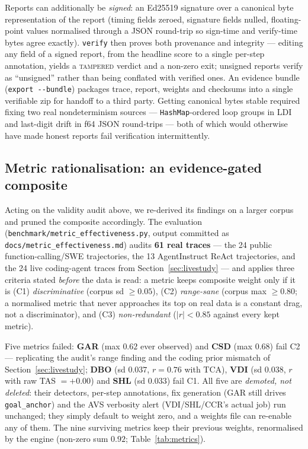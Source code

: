\documentclass[11pt]{article}
\newcommand{\code}[1]{\texttt{#1}}
\begin{document}
Reports can additionally be \emph{signed}: an Ed25519 signature over a
canonical byte representation of the report (timing fields zeroed, signature
fields nulled, floating-point values normalised through a JSON round-trip so
sign-time and verify-time bytes agree exactly). \code{verify} then proves both
provenance and integrity --- editing any field of a signed report, from the
headline score to a single per-step annotation, yields a \textsc{tampered}
verdict and a non-zero exit; unsigned reports verify as
``unsigned'' rather than being conflated with verified ones. An evidence
bundle (\code{export -{}-bundle}) packages trace, report, weights and
checksums into a single verifiable zip for handoff to a third party. Getting
canonical bytes stable required fixing two real nondeterminism sources ---
\code{HashMap}-ordered loop groups in LDI and last-digit drift in f64 JSON
round-trips --- both of which would otherwise have made honest reports fail
verification intermittently.

\subsection{Metric rationalisation: an evidence-gated composite}
\label{sec:rationalisation}
Acting on the validity audit above, we re-derived its findings on a larger
corpus and pruned the composite accordingly. The evaluation
(\code{benchmark/metric\_effectiveness.py}, output committed as
\code{docs/metric\_effectiveness.md}) audits \textbf{61 real traces} --- the
24 public function-calling/SWE trajectories, the 13 AgentInstruct ReAct
trajectories, and the 24 live coding-agent traces from
Section~\ref{sec:livestudy} --- and applies three criteria stated
\emph{before} the data is read: a metric keeps composite weight only if it is
(C1) \emph{discriminative} (corpus sd $\ge 0.05$), (C2) \emph{range-sane}
(corpus max $\ge 0.80$; a normalised metric that never approaches its top on
real data is a constant drag, not a discriminator), and (C3)
\emph{non-redundant} ($|r| < 0.85$ against every kept metric).

Five metrics failed: \textbf{GAR} (max $0.62$ ever observed) and \textbf{CSD}
(max $0.68$) fail C2 --- replicating the audit's range finding and the coding
prior mismatch of Section~\ref{sec:livestudy}; \textbf{DBO}
(sd $0.037$, $r=0.76$ with TCA), \textbf{VDI} (sd $0.038$, $r$ with raw TAS
$=+0.00$) and \textbf{SHL} (sd $0.033$) fail C1. All five are
\emph{demoted, not deleted}: their detectors, per-step annotations, fix
generation (GAR still drives \code{goal\_anchor}) and the AVS verbosity alert
(VDI/SHL/CCR's actual job) run unchanged; they simply default to weight zero,
and a weights file can re-enable any of them. The nine surviving metrics keep
their previous weights, renormalised by the engine (non-zero sum $0.92$;
Table~\ref{tab:metrics}).
\end{document}
